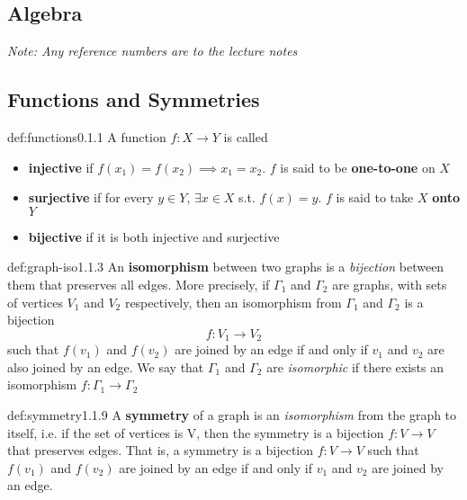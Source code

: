\documentclass[landscape, 8pt]{extarticle}
\begin{document}
\setlength{\abovedisplayskip}{3.5pt}
\setlength{\belowdisplayskip}{3.5pt}
\setlength{\abovedisplayshortskip}{3.5pt}
\setlength{\belowdisplayshortskip}{3.5pt}

\begin{multicols}{3}
\raggedcolumns
\section{\huge Algebra}
\textit{Note: Any reference numbers are to the lecture notes}
\vspace{-5pt}
\subsection*{Functions and Symmetries}

\begin{dfn}[Functions]{def:functions}{0.1.1}
A function $f:X\to Y$ is called
\renewcommand\labelitemi{\tiny$\bullet$}
\begin{itemize}
    \setlength\itemsep{0em}
    \item \textbf{injective} if $f(x_{1}) = f(x_{2}) \implies x_{1} = x_{{2}}$. $f$ is said to be \textbf{one-to-one} on $X$
    \item \textbf{surjective} if for every $y\in Y,\, \exists x\in X$ s.t. $f(x) = y$. $f$ is said to take $X$ \textbf{onto} $Y$
    \item \textbf{bijective} if it is both injective and surjective
\end{itemize}
\end{dfn}
\vspace{-5pt}

\begin{dfn}{def:graph-iso}{1.1.3}
    An \textbf{isomorphism} between two graphs is a \textit{bijection} between them that preserves all edges. More precisely, if $\Gamma_{1}$ and $\Gamma_{2}$ are graphs, with sets of vertices $V_{1}$ and $V_{2}$ respectively, then an isomorphism from $\Gamma_{1}$ and $\Gamma_{2}$ is a bijection
    \[f : V_{1}\to V_{2}\]
    such that $f(v_{1})$ and $f(v_{2})$ are joined by an edge if and only if $v_{1}$ and $v_{2}$ are also joined by an edge.
    We say that $\Gamma_{1}$ and $\Gamma_{2}$ are \textit{isomorphic} if there exists an isomorphism $f:\Gamma_{1}\to\Gamma_{2}$
\end{dfn}
\vspace{-5pt}

\begin{dfn}[Symmetry]{def:symmetry}{1.1.9}
    A \textbf{symmetry} of a graph is an \textit{isomorphism} from the graph to itself, i.e. if the set of vertices is V, then the symmetry is a bijection $f:V\to V$ that preserves edges. That is, a symmetry is a bijection $f:V\to V$ such that $f(v_{1})$ and $f(v_{2})$ are joined by an edge if and only if $v_{1}$ and $v_{2}$ are joined by an edge.
\end{dfn}
\vspace{-5pt}


\end{multicols}
\end{document}
